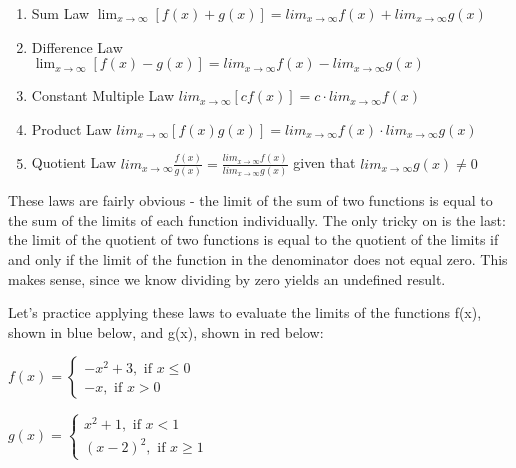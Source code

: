 \begin{enumerate}
    \item Sum Law $\lim_{x\to\infty} \left[f(x) + g(x) \right] = lim_{x\to\infty} f(x) + lim_{x\to\infty} g(x)$
    \item Difference Law $\lim_{x\to\infty} \left[f(x) - g(x) \right] = lim_{x\to\infty} f(x) - lim_{x\to\infty} g(x)$
    \item Constant Multiple Law $lim_{x\to\infty} \left[\textit{c}f(x) \right] = \textit{c} \cdot lim_{x\to\infty}    f(x) $
    \item Product Law $lim_{x\to\infty} \left[f(x)g(x) \right] = lim_{x\to\infty}f(x) \cdot lim_{x\to\infty} g(x)$
    \item Quotient Law $lim_{x\to\infty} \frac{f(x)}{g(x)} = \frac{lim_{x\to\infty} f(x)}{lim_{x\to\infty} g(x)}$ given that $lim_{x\to\infty} g(x) \neq 0$
\end{enumerate}

These laws are fairly obvious - the limit of the sum of two functions is equal to the sum of the limits of each function individually. The only tricky on is the last: the limit of the quotient of two functions is equal to the quotient of the limits if and only if the limit of the function in the denominator does not equal zero. This makes sense, since we know dividing by zero yields an undefined result. 

Let's practice applying these laws to evaluate the limits of the functions f(x), shown in blue below, and g(x), shown in red below:

$f(x) = \begin{cases}
    -x^2+3, \text{ if } x \leq 0\\
    -x, \text{ if } x > 0
\end{cases}$

$g(x) = \begin{cases}
   x^2+1, \text{ if } x < 1 \\
    (x-2)^2, \text{ if } x \geq 1
\end{cases}$


